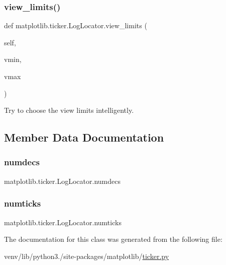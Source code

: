\subsubsection{\texorpdfstring{view\+\_\+limits()}{view\_limits()}}
{\footnotesize\ttfamily def matplotlib.\+ticker.\+Log\+Locator.\+view\+\_\+limits (\begin{DoxyParamCaption}\item[{}]{self,  }\item[{}]{vmin,  }\item[{}]{vmax }\end{DoxyParamCaption})}

\begin{DoxyVerb}Try to choose the view limits intelligently.\end{DoxyVerb}
 

\subsection{Member Data Documentation}
\mbox{\label{classmatplotlib_1_1ticker_1_1LogLocator_ab606e4a57ea96a790bb2b63c3fcf93fe}} 
\subsubsection{\texorpdfstring{numdecs}{numdecs}}
{\footnotesize\ttfamily matplotlib.\+ticker.\+Log\+Locator.\+numdecs}

\mbox{\label{classmatplotlib_1_1ticker_1_1LogLocator_a77bbfb4efea21cfc057a79ed4eb81c17}} 
\subsubsection{\texorpdfstring{numticks}{numticks}}
{\footnotesize\ttfamily matplotlib.\+ticker.\+Log\+Locator.\+numticks}



The documentation for this class was generated from the following file\+:\begin{DoxyCompactItemize}
\item 
venv/lib/python3./site-\/packages/matplotlib/\hyperlink{ticker_8py}{ticker.\+py}\end{DoxyCompactItemize}
